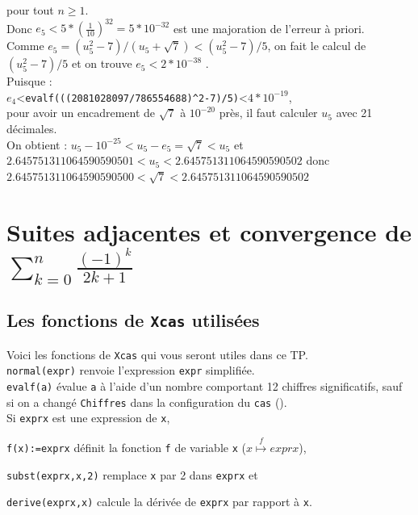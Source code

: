 \documentclass[a4paper,11pt]{book}
\begin{document}
pour tout $n \geq 1$.\\ 
Donc $e_5<5*(\frac{1}{10})^{32}=5*10^{-32}$ est une majoration de l'erreur \`a 
priori.\\
 Comme $e_5=(u_5^2-7)/(u_5+\sqrt 7)<(u_5^2-7)/5$, on fait le calcul
de  $(u_5^2-7)/5$ et on trouve $e_5<2*10^{-38}$ .\\
Puisque :\\
 $e_4$<{\tt evalf(((2081028097/786554688)\verb|^|2-7)/5)}<$4*10^{-19}$,\\ 
 pour avoir un encadrement de $\sqrt 7$ \`a $10^{-20}$ pr\`es, il faut calculer $u_5$ avec 21 d\'ecimales.\\
On obtient :
$u_5-10^{-25}<u_5-e_5=\sqrt 7<u_5$ et\\
 $2.645751311064590590501<u_5<2.645751311064590590502$ donc\\
$2.645751311064590590500<\sqrt 7<2.645751311064590590502$


\section{Suites adjacentes et convergence de 
$\displaystyle \sum_{k=0}^n \frac{(-1)^k}{2k+1}$}
\subsection{Les fonctions de {\tt Xcas} utilis\'ees}
Voici les fonctions de {\tt Xcas} qui vous seront utiles dans ce TP.\\ 
{\tt normal(expr)} renvoie l'expression {\tt expr} simplifi\'ee.\\
{\tt evalf(a)} \'evalue {\tt a} \`a l'aide d'un nombre comportant 
12 chiffres significatifs, sauf si on a chang\'e {\tt Chiffres} dans la configuration du {\tt cas} ().\\
 Si {\tt exprx} est une expression de {\tt x},

{\tt f(x):=exprx} d\'efinit la fonction {\tt f} de variable {\tt x} 
($x \stackrel{f}{\longmapsto} exprx$),

{\tt subst(exprx,x,2)} remplace {\tt x} par 2 dans {\tt exprx} et

{\tt derive(exprx,x)} calcule la d\'eriv\'ee de {\tt exprx} par rapport \`a 
 {\tt x}.
\end{document}
